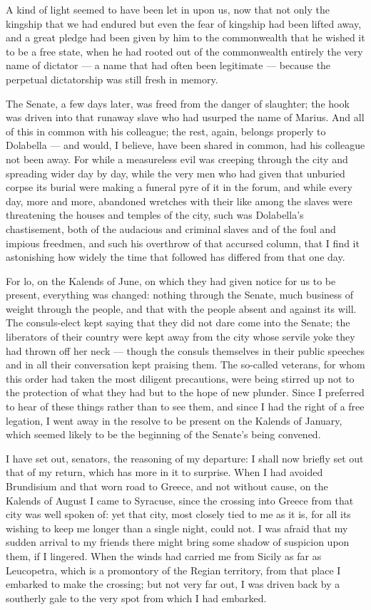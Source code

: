  A kind of light seemed to have been let in upon us, now that not only the kingship that we had endured but even the fear of kingship had been lifted away, and a great pledge had been given by him to the commonwealth that he wished it to be a free state, when he had rooted out of the commonwealth entirely the very name of dictator --- a name that had often been legitimate --- because the perpetual dictatorship was still fresh in memory.

 The Senate, a few days later, was freed from the danger of slaughter; the hook was driven into that runaway slave who had usurped the name of Marius. And all of this in common with his colleague; the rest, again, belongs properly to Dolabella --- and would, I believe, have been shared in common, had his colleague not been away. For while a measureless evil was creeping through the city and spreading wider day by day, while the very men who had given that unburied corpse its burial were making a funeral pyre of it in the forum, and while every day, more and more, abandoned wretches with their like among the slaves were threatening the houses and temples of the city, such was Dolabella's chastisement, both of the audacious and criminal slaves and of the foul and impious freedmen, and such his overthrow of that accursed column, that I find it astonishing how widely the time that followed has differed from that one day.

 For lo, on the Kalends of June, on which they had given notice for us to be present, everything was changed: nothing through the Senate, much business of weight through the people, and that with the people absent and against its will. The consuls-elect kept saying that they did not dare come into the Senate; the liberators of their country were kept away from the city whose servile yoke they had thrown off her neck --- though the consuls themselves in their public speeches and in all their conversation kept praising them. The so-called veterans, for whom this order had taken the most diligent precautions, were being stirred up not to the protection of what they had but to the hope of new plunder. Since I preferred to hear of these things rather than to see them, and since I had the right of a free legation, I went away in the resolve to be present on the Kalends of January, which seemed likely to be the beginning of the Senate's being convened.

 I have set out, senators, the reasoning of my departure: I shall now briefly set out that of my return, which has more in it to surprise. When I had avoided Brundisium and that worn road to Greece, and not without cause, on the Kalends of August I came to Syracuse, since the crossing into Greece from that city was well spoken of: yet that city, most closely tied to me as it is, for all its wishing to keep me longer than a single night, could not. I was afraid that my sudden arrival to my friends there might bring some shadow of suspicion upon them, if I lingered. When the winds had carried me from Sicily as far as Leucopetra, which is a promontory of the Regian territory, from that place I embarked to make the crossing; but not very far out, I was driven back by a southerly gale to the very spot from which I had embarked.

